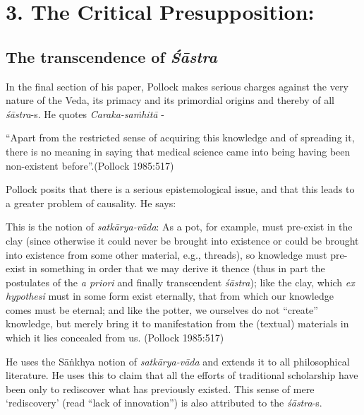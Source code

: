 \section*{3. The Critical Presupposition:}

\subsection*{The transcendence of {{\sl\bfseries Śāstra}\relax}}

In the final section of his paper, Pollock makes serious charges against the very nature of the Veda, its primacy and its primordial origins and thereby of all {\sl śāstra}-s. He quotes {\sl Caraka-saṁhitā} - 
\begin{myquote}
``Apart from the restricted sense of acquiring this knowledge and of spreading it, there is no meaning in saying that medical science came into being having been non-existent before''.\hfill (Pollock 1985:517)
\end{myquote}

Pollock posits that there is a serious  epistemological issue, and that this leads to a greater problem of causality. He says:

\begin{myquote}
This is the notion of {\sl satkārya-vāda}: As a pot, for example, must pre-exist in the clay (since otherwise it could never be brought into existence or could be brought into existence from some other material, e.g., threads), so knowledge must pre-exist in something in order that we may derive it thence (thus in part the postulates of the {\sl a priori} and finally transcendent {\sl śāstra}); like the clay, which {\sl ex hypothesi} must in some form exist eternally, that from which our knowledge comes must be eternal; and like the potter, we ourselves do not ``create'' knowledge, but merely bring it to manifestation from the (textual) materials in which it lies concealed from us. 
\hfill	(Pollock 1985:517)
\end{myquote}

He uses the Sāṅkhya notion of {\sl satkārya-vāda}  and extends it to all philosophical literature. He uses this to claim that all the efforts of traditional scholarship have been only to rediscover what has previously existed. This sense of mere `rediscovery' (read ``lack of innovation'') is also attributed to the {\sl śāstra}-s.

